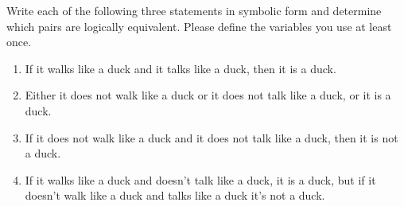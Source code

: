 \documentclass{exercise}
\begin{document}
   Write each of the following three statements in symbolic form and determine which pairs are logically equivalent. Please define the variables you use at least once.
    \begin{enumerate}
      \item If it walks like a duck and it talks like a duck, then it is a duck.

      \item Either it does not walk like a duck or it does not talk like a duck, or it is a duck.

      \item If it does not walk like a duck and it does not talk like a duck, then it is not a duck.
      
      \item If it walks like a duck and doesn't talk like a duck, it is a duck, but if it doesn't walk like a duck and talks like a duck it's not a duck.

    \end{enumerate}
\end{document}
